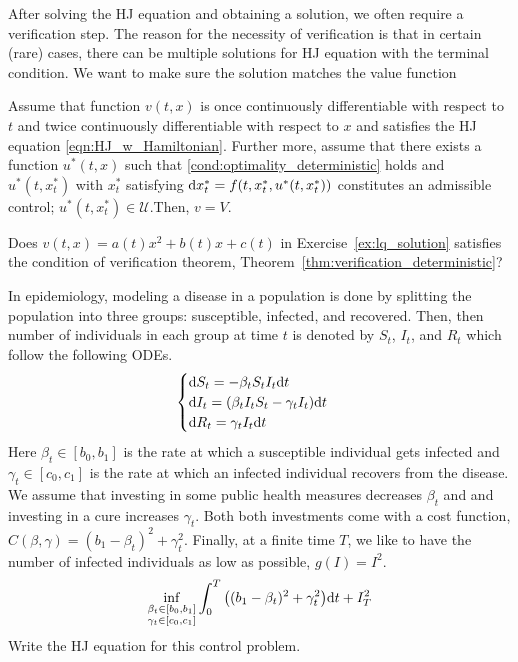 \documentclass[11pt]{book}
\newcommand{\dd}{\text{\normalfont d}}
\newcommand{\dt}{\text{\normalfont d}t}
\newcommand{\dx}{\text{\normalfont d}x}
\begin{document}
After solving the HJ equation and obtaining a solution, we often require a verification step. The reason for the necessity of verification is that in certain (rare) cases, there can be multiple solutions for HJ equation with the terminal condition. We want to make sure the solution matches the value function
\begin{thm}
\label{thm:verification_deterministic}
    Assume that function $v(t,x)$ is once continuously differentiable with respect to $t$ and twice  continuously differentiable with respect to $x$ and satisfies the HJ equation \eqref{eqn:HJ_w_Hamiltonian}. Further more, assume that there exists a function $u^*(t,x)$ such that \eqref{cond:optimality_deterministic} holds and $u^*(t,x^*_t)$ with $x_t^*$ satisfying $\dx^*_t=f(t,x^*_t,u^*(t,x^*_t))$ constitutes an admissible control; $u^*(t,x^*_t)\in\mathcal{U}$.Then, $v=V$.
\end{thm}
\begin{ex}
    Does $v(t,x)=a(t)x^2+b(t)x+c(t)$ in Exercise~\ref{ex:lq_solution} satisfies the condition of verification theorem, Theorem~\ref{thm:verification_deterministic}?
\end{ex}
\begin{ex}\label{ex:SIR}
        In epidemiology, modeling a disease in a population is done by splitting the population into three groups: susceptible, infected, and recovered. Then, then number of individuals in each group at time $t$ is denoted by $S_t$, $I_t$, and $R_t$ which follow the following ODEs.
        \[
        \begin{cases}
            \dd{S}_t=-\beta_t S_t I_t \dt\\
            \dd{I}_t = (\beta_t I_t S_t - \gamma_t I_t)\dt\\
            \dd{R}_t= \gamma_t I_t \dt
        \end{cases}
        \]
        Here $\beta_t\in[b_0,b_1]$ is the rate at which a susceptible individual gets infected and $\gamma_t\in[c_0,c_1]$ is the rate at which an infected individual recovers from the disease.  We assume that investing in some public health  measures decreases $\beta_t$ and and investing in a cure increases $\gamma_t$. Both both investments come with a cost function, $C(\beta,\gamma)=(b_1-\beta_t)^2+\gamma_t^2$. Finally, at a finite time $T$, we like to have the number of infected individuals as low as possible, $g(I)=I^2$.
    \[
    \inf_{\substack{\beta_t\in[b_0,b_1] \\\gamma_t\in[c_0,c_1]}} \int_0^T \big((b_1-\beta_t)^2+\gamma_t^2\big)\dt + I^2_T
    \]
    Write the HJ equation for this control problem.
\end{ex}
\end{document}
